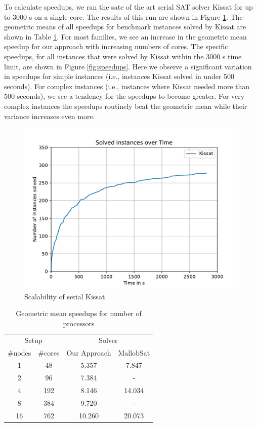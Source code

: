\documentclass[12pt,a4paper,twoside]{scrartcl}
\numberwithin{equation}{section}
\begin{document}
To calculate speedups, we ran the sate of the art serial SAT solver Kissat \cite{kissat} for up to 3000 s on a single core. The results of this run are shown in Figure \ref{fig:runtimeSerial}. The geometric means of all speedups for benchmark instances solved by Kissat are shown in Table \ref{tab:speedups}. For most families, we see an increase in the geometric mean speedup for our approach with increasing numbers of cores. The specific speedups, for all instances that were solved by Kissat within the 3000 s time limit, are shown in Figure \ref{fig:speedups}. Here we observe a significant variation in speedups for simple instances (i.e., instances Kissat solved in under 500 seconds). For complex instances (i.e., instances where Kissat needed more than 500 seconds), we see a tendency for the speedups to become greater. For very complex instances the speedups routinely beat the geometric mean while their variance increases even more.

\begin{figure}
  \center
  \includegraphics[scale=.5]{plots/cumulative_runtime/scalability_serial.pdf}
  \caption{Scalability of serial Kissat}
  \label{fig:runtimeSerial}
\end{figure}

\begin{table}
  \center
  \begin{tabular}{ cccc }
    \toprule
    \multicolumn{2}{c}{Setup} & \multicolumn{2}{c}{Solver}\\
    \#nodes   & \#cores   & Our Approach  & MallobSat \\
    \midrule
    1  & 48  & 5.357    & 7.847\\
    2  & 96  & 7.384    & -\\
    4  & 192 & 8.146    & 14.034\\
    8  & 384 & 9.720    & -\\
    16 & 762 & 10.260   & 20.073\\
    \bottomrule
  \end{tabular}
  \caption{Geometric mean speedups for number of processors}
  \label{tab:speedups}
\end{table}
\end{document}

